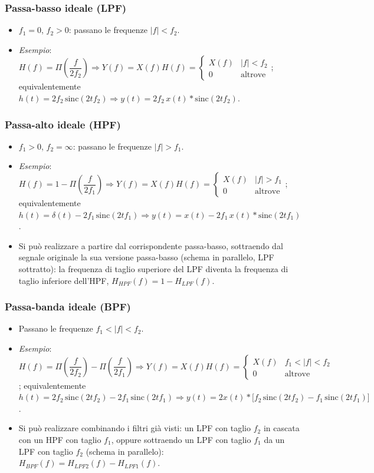 \documentclass[12pt, a4paper]{article}
\begin{document}
\subsubsection{Passa-basso ideale (LPF)}
\begin{itemize}
    \item $f_1=0$, $f_2>0$: passano le frequenze $|f|<f_2$.
    \item \textit{Esempio}: $H(f)=\Pi\!\left(\dfrac{f}{2f_2}\right) \Rightarrow Y(f)=X(f)H(f)=\begin{cases}X(f) & |f|<f_2\\0&\text{altrove}\end{cases}$; equivalentemente $h(t)=2f_2\,\text{sinc}(2tf_2) \Rightarrow y(t)=2f_2\,x(t)*\text{sinc}(2tf_2)$.
\end{itemize}

\subsubsection{Passa-alto ideale (HPF)}
\begin{itemize}
    \item $f_1>0$, $f_2=\infty$: passano le frequenze $|f|>f_1$.
    \item \textit{Esempio}: $H(f)=1-\Pi\!\left(\dfrac{f}{2f_1}\right) \Rightarrow Y(f)=X(f)H(f)=\begin{cases}X(f) & |f|>f_1\\0&\text{altrove}\end{cases}$; equivalentemente $h(t)=\delta(t)-2f_1\,\text{sinc}(2tf_1) \Rightarrow y(t)=x(t)-2f_1\,x(t)*\text{sinc}(2tf_1)$.
    \item Si può realizzare a partire dal corrispondente passa-basso, sottraendo dal segnale originale la sua versione passa-basso (schema in parallelo, LPF sottratto): la frequenza di taglio superiore del LPF diventa la frequenza di taglio inferiore dell'HPF, $H_{HPF}(f)=1-H_{LPF}(f)$.
\end{itemize}

\subsubsection{Passa-banda ideale (BPF)}
\begin{itemize}
    \item Passano le frequenze $f_1<|f|<f_2$.
    \item \textit{Esempio}: $H(f)=\Pi\!\left(\dfrac{f}{2f_2}\right)-\Pi\!\left(\dfrac{f}{2f_1}\right) \Rightarrow Y(f)=X(f)H(f)=\begin{cases}X(f) & f_1<|f|<f_2\\0&\text{altrove}\end{cases}$; equivalentemente $h(t)=2f_2\,\text{sinc}(2tf_2)-2f_1\,\text{sinc}(2tf_1) \Rightarrow y(t)=2x(t)*\big[f_2\,\text{sinc}(2tf_2)-f_1\,\text{sinc}(2tf_1)\big]$.
    \item Si può realizzare combinando i filtri già visti: un LPF con taglio $f_2$ in cascata con un HPF con taglio $f_1$, oppure sottraendo un LPF con taglio $f_1$ da un LPF con taglio $f_2$ (schema in parallelo): $H_{BPF}(f)=H_{LPF2}(f)-H_{LPF1}(f)$.
\end{itemize}
\end{document}
